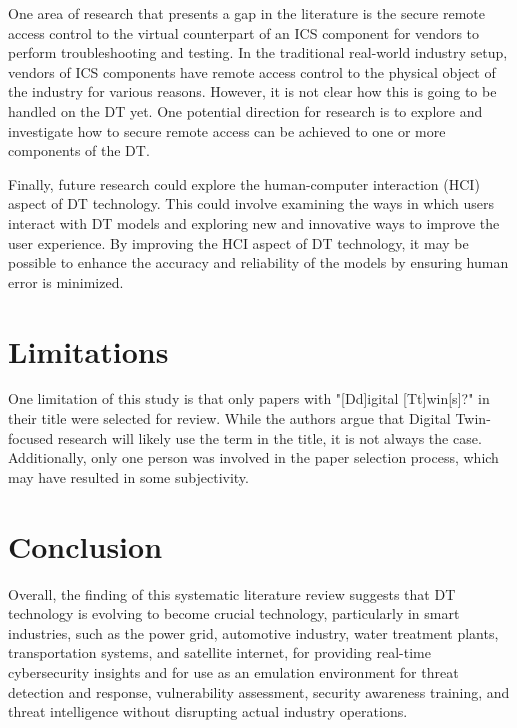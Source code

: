 One area of research that presents a gap in the literature is the secure remote access control to the virtual counterpart of an ICS component for vendors to perform troubleshooting and testing. In the traditional real-world industry setup, vendors of ICS components have remote access control to the physical object of the industry for various reasons. However, it is not clear how this is going to be handled on the DT yet. One potential direction for research is to explore and investigate how to secure remote access can be achieved to one or more components of the DT.

Finally, future research could explore the human-computer interaction (HCI) aspect of DT technology. This could involve examining the ways in which users interact with DT models and exploring new and innovative ways to improve the user experience. By improving the HCI aspect of DT technology, it may be possible to enhance the accuracy and reliability of the models by ensuring human error is minimized.

\section{Limitations}

One limitation of this study is that only papers with "[Dd]igital [Tt]win[s]?" in their title were selected for review. While the authors argue that Digital Twin-focused research will likely use the term in the title, it is not always the case. Additionally, only one person was involved in the paper selection process, which may have resulted in some subjectivity.

\section{Conclusion}
Overall, the finding of this systematic literature review suggests that DT technology is evolving to become crucial technology, particularly in smart industries, such as the power grid, automotive industry, water treatment plants, transportation systems, and satellite internet, for providing real-time cybersecurity insights and for use as an emulation environment for threat detection and response, vulnerability assessment, security awareness training, and threat intelligence without disrupting actual industry operations. 

